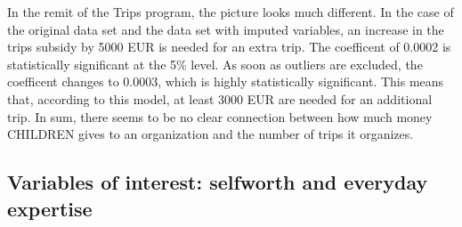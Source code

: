 \documentclass[12pt, a4paper, titlepage]{article}\usepackage[]{graphicx}\usepackage[]{color}
\begin{document}
In the remit of the Trips program, the picture looks much different. In the case of the original data set and the data set with imputed variables, an increase in the trips subsidy by 5000 EUR is needed for an extra trip. The coefficent of 0.0002 is statistically significant at the 5\% level. As soon as outliers are excluded, the coefficent changes to 0.0003, which is highly statistically significant. This means that, according to this model, at least 3000 EUR are needed for an additional trip.
In sum, there seems to be no clear connection between how much money CHILDREN gives to an organization and the number of trips it organizes. 


\begin{table}
\begin{center}
\caption{Regression Results: Number of trips}
\label{GrantsRegressionsTrips}
\end{center}
\end{table}


\subsection{Variables of interest: selfworth and everyday expertise} 
\end{document}

